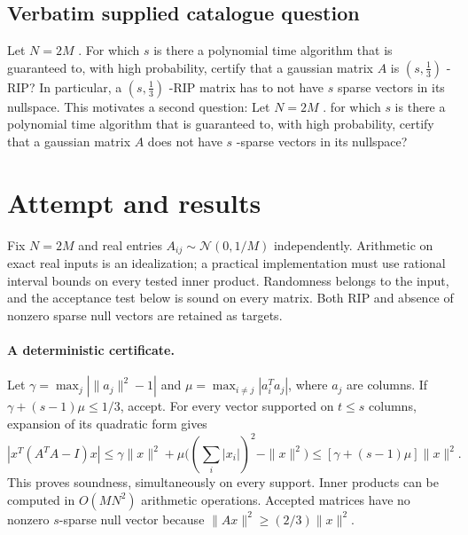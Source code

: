 \documentclass[11pt]{article}
\begin{document}
\subsection{Verbatim supplied catalogue question}
Let $N = 2M$ . For which $s$ is there a polynomial time algorithm that is guaranteed to, with high probability, certify that a gaussian matrix $A$ is $\left(s,\frac13\right)$ -RIP? In particular, a $\left(s,\frac13\right)$ -RIP matrix has to not have $s$ sparse vectors in its nullspace. This motivates a second question: Let $N = 2M$ . for which $s$ is there a polynomial time algorithm that is guaranteed to, with high probability, certify that a gaussian matrix $A$ does not have $s$ -sparse vectors in its nullspace?

\section{Attempt and results}
Fix $N=2M$ and real entries $A_{ij}\sim\mathcal N(0,1/M)$ independently.
Arithmetic on exact real inputs is an idealization; a practical implementation
must use rational interval bounds on every tested inner product. Randomness
belongs to the input, and the acceptance test below is sound on every matrix.
Both RIP and absence of nonzero sparse null vectors are retained as targets.

\paragraph{A deterministic certificate.}
Let $\gamma=\max_j|\|a_j\|^2-1|$ and
$\mu=\max_{i\ne j}|a_i^Ta_j|$, where $a_j$ are columns. If
$\gamma+(s-1)\mu\le1/3$, accept. For every vector supported on $t\le s$
columns, expansion of its quadratic form gives
\[
|x^T(A^TA-I)x|\le\gamma\|x\|^2+
\mu\big((\sum_i|x_i|)^2-\|x\|^2\big)
\le[\gamma+(s-1)\mu]\|x\|^2.
\]
This proves soundness, simultaneously on every support. Inner products can be
computed in $O(MN^2)$ arithmetic operations. Accepted matrices have no nonzero
$s$-sparse null vector because $\|Ax\|^2\ge(2/3)\|x\|^2$.
\end{document}
